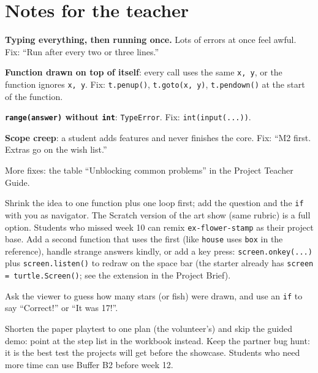 \section{Notes for the teacher}
\begin{commonmistakes}
  \item \textbf{Typing everything, then running once.} Lots of errors at once feel awful. Fix: \enquote{Run after every two or three lines.}
  \item \textbf{Function drawn on top of itself}: every call uses the same \texttt{x, y}, or the function ignores \texttt{x, y}. Fix: \texttt{t.penup()}, \texttt{t.goto(x, y)}, \texttt{t.pendown()} at the start of the function.
  \item \textbf{\texttt{range(answer)} without \texttt{int}}: \texttt{TypeError}. Fix: \texttt{int(input(...))}.
  \item \textbf{Scope creep}: a student adds features and never finishes the core. Fix: \enquote{M2 first. Extras go on the wish list.}
  \item More fixes: the table \enquote{Unblocking common problems} in the Project Teacher Guide.
\end{commonmistakes}
\begin{differentiation}
\supportpath Shrink the idea to one function plus one loop first; add the question and the \texttt{if} with you as navigator. The Scratch version of the art show (same rubric) is a full option. Students who missed week 10 can remix \texttt{ex-flower-stamp} as their project base.
\extensionpath Add a second function that uses the first (like \texttt{house} uses \texttt{box} in the reference), handle strange answers kindly, or add a key press: \texttt{screen.onkey(...)} plus \texttt{screen.listen()} to redraw on the space bar (the starter already has \texttt{screen = turtle.Screen()}; see the extension in the Project Brief).
\end{differentiation}
\begin{stretchchallenge}
Ask the viewer to guess how many stars (or fish) were drawn, and use an \texttt{if} to say \enquote{Correct!} or \enquote{It was 17!}.
\end{stretchchallenge}
\begin{teachernote}
Shorten the paper playtest to one plan (the volunteer's) and skip the guided demo: point at the step list in the workbook instead. Keep the partner bug hunt: it is the best test the projects will get before the showcase. Students who need more time can use Buffer B2 before week 12.
\end{teachernote}
